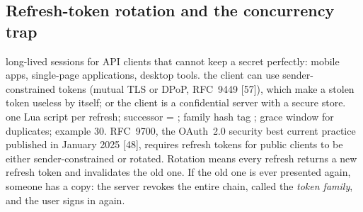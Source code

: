 \subsection*{Refresh-token rotation and the concurrency trap}
{long-lived sessions for API clients that cannot keep a secret perfectly: mobile apps, single-page applications, desktop tools.}
{the client can use sender-constrained tokens (mutual TLS or DPoP, RFC~9449 [57]), which make a stolen token useless by itself; or the client is a confidential server with a secure store.}
{one Lua script per refresh; successor = ; family hash tag ; grace window for duplicates; example 30.}
RFC~9700, the OAuth~2.0 security best current practice published in January 2025 [48], requires refresh tokens for public clients to be either sender-constrained or rotated. Rotation means every refresh returns a new refresh token and invalidates the old one. If the old one is ever presented again, someone has a copy: the server revokes the entire chain, called the \emph{token family}, and the user signs in again.

